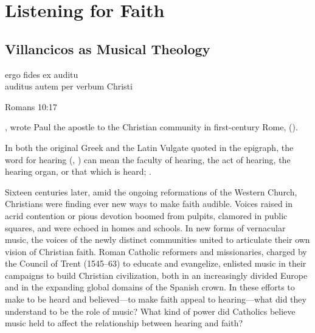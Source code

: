 
% 

\part{Listening for Faith}
\label{part:faith}

\chapter{Villancicos as Musical Theology}
\label{ch:intro}

\epigraph
{ergo fides ex auditu\\
auditus autem per verbum Christi}
{Romans 10:17}

, wrote Paul the apostle to the Christian
community in first-century Rome,  ().%
\begin{Footnote}
    In both the original Greek and the Latin Vulgate quoted in the epigraph,
    the word for hearing (, ) can mean the
    faculty of hearing, the act of hearing, the hearing organ, or that which is
    heard; 
    \Autocite[]{BDAG}.
\end{Footnote}
Sixteen centuries later, amid the ongoing reformations of the Western Church,
Christians were finding ever new ways to make faith audible.
Voices raised in acrid contention or pious devotion boomed from pulpits,
clamored in public squares, and were echoed in homes and schools.  
In new forms of vernacular music, the voices of the newly distinct communities
united to articulate their own vision of Christian faith.
Roman Catholic reformers and missionaries, charged by the Council of Trent
(1545--63) to educate and evangelize, enlisted music in their campaigns to
build Christian civilization, both in an increasingly divided Europe and in the
expanding global domains of the Spanish crown.
In these efforts to make  to be heard and
believed---to make faith appeal to hearing---what did they understand to be the
role of music?
What kind of power did Catholics believe music held to affect the relationship
between hearing and faith?

